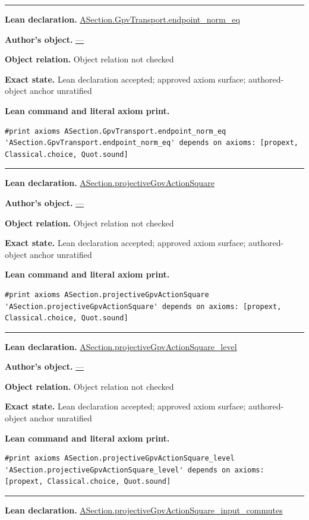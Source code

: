 \documentclass[11pt]{article}
\theoremstyle{plain}
\theoremstyle{definition}
\theoremstyle{remark}
\begin{document}
\begin{tcolorbox}
\begin{Verbatim}[breaklines=true,breakanywhere=true,fontsize=\small]
\end{Verbatim}
\medskip\hrule\medskip
\textbf{Lean declaration.} \url{ASection.GpvTransport.endpoint_norm_eq}
\par\textbf{Author's object.} \url{—}
\par\textbf{Object relation.} Object relation not checked
\par\textbf{Exact state.} Lean declaration accepted; approved axiom surface; authored-object anchor unratified
\par\smallskip\textbf{Lean command and literal axiom print.}
\begin{Verbatim}[breaklines=true,breakanywhere=true,fontsize=\small]
#print axioms ASection.GpvTransport.endpoint_norm_eq
'ASection.GpvTransport.endpoint_norm_eq' depends on axioms: [propext, Classical.choice, Quot.sound]
\end{Verbatim}
\medskip\hrule\medskip
\textbf{Lean declaration.} \url{ASection.projectiveGpvActionSquare}
\par\textbf{Author's object.} \url{—}
\par\textbf{Object relation.} Object relation not checked
\par\textbf{Exact state.} Lean declaration accepted; approved axiom surface; authored-object anchor unratified
\par\smallskip\textbf{Lean command and literal axiom print.}
\begin{Verbatim}[breaklines=true,breakanywhere=true,fontsize=\small]
#print axioms ASection.projectiveGpvActionSquare
'ASection.projectiveGpvActionSquare' depends on axioms: [propext, Classical.choice, Quot.sound]
\end{Verbatim}
\medskip\hrule\medskip
\textbf{Lean declaration.} \url{ASection.projectiveGpvActionSquare_level}
\par\textbf{Author's object.} \url{—}
\par\textbf{Object relation.} Object relation not checked
\par\textbf{Exact state.} Lean declaration accepted; approved axiom surface; authored-object anchor unratified
\par\smallskip\textbf{Lean command and literal axiom print.}
\begin{Verbatim}[breaklines=true,breakanywhere=true,fontsize=\small]
#print axioms ASection.projectiveGpvActionSquare_level
'ASection.projectiveGpvActionSquare_level' depends on axioms: [propext, Classical.choice, Quot.sound]
\end{Verbatim}
\medskip\hrule\medskip
\textbf{Lean declaration.} \url{ASection.projectiveGpvActionSquare_input_commutes}

\end{tcolorbox}
\end{document}
